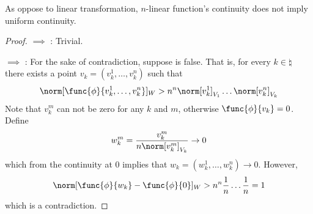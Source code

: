 \begin{remark}
    As oppose to linear transformation, \(n\)-linear function's continuity does not imply uniform continuity.
\end{remark}

\begin{proof}
     \(\implies\) : Trivial.

     \(\implies\) : For the sake of contradiction, suppose  is false. That is, for every \(k \in \natural\) there exists a point \(v_k = (v^1_k, \dots , v^n_k)\) such that
    \begin{equation*}
        \norm[\func{\phi}{v^1_k, \dots , v^n_k}]_W > n^n \norm[v^1_k]_{V_1} \dots \norm[v^n_k]_{V_k}
    \end{equation*}
    Note that \(v^m_k\) can not be zero for any \(k\) and \(m\), otherwise \(\func{\phi}{v_k} = 0 \). Define
    \begin{equation*}
        w^m_k = \dfrac{v^m_k}{n\norm[v^m_k]_{V_k}} \to 0
    \end{equation*}
    which from the continuity at 0 implies that \(w_k = (w^1_k, \dots , w^n_k) \to 0\). However,
    \begin{equation*}
        \norm[ \func{\phi}{w_k} - \func{\phi}{0}]_W > n^n \frac{1}{n} \dots \frac{1}{n} = 1
    \end{equation*}
    which is a contradiction.


\end{proof}

